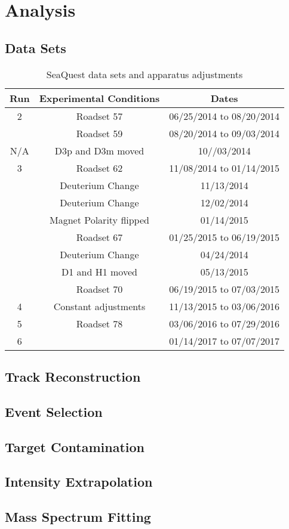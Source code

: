 \documentclass[../main.tex]{subfiles}
\begin{document}
\ifSubfilesClassLoaded{
	\mainmatter
	\setcounter{chapter}{2}
}{}

\chapter{Analysis}
\label{ch:analysis}

\section{Data Sets}

\begin{table}[h!]
	\centering
	\begin{tabular}{ c c c }
		\hline
		Run & Experimental Conditions & Dates\\
		\hline
		2   & Roadset 57 & 06/25/2014 to 08/20/2014\\
		    & Roadset 59 & 08/20/2014 to 09/03/2014\\
		\hline
		N/A & D3p and D3m moved & 10//03/2014\\
		\hline
		3   & Roadset 62 & 11/08/2014 to 01/14/2015\\
		    & Deuterium Change & 11/13/2014\\
		    & Deuterium Change & 12/02/2014\\
		    & Magnet Polarity flipped & 01/14/2015\\
		    & Roadset 67 & 01/25/2015 to 06/19/2015\\
		    & Deuterium Change & 04/24/2014\\
		    & D1 and H1 moved & 05/13/2015\\
		    & Roadset 70 & 06/19/2015 to 07/03/2015\\
		\hline
		4   & Constant adjustments & 11/13/2015 to 03/06/2016\\
		5   & Roadset 78 & 03/06/2016 to 07/29/2016\\
		6   &   & 01/14/2017 to 07/07/2017\\
	\end{tabular}
	\caption{SeaQuest data sets and apparatus adjustments}
	\label{tab:dataset}
\end{table}


\section{Track Reconstruction}

\section{Event Selection}

\section{Target Contamination}

\section{Intensity Extrapolation}

\section{Mass Spectrum Fitting}
\label{sec:extrapolation}

\ifSubfilesClassLoaded{ \printbibliography[heading=bibintoc,title={References}]}{}
\end{document}
